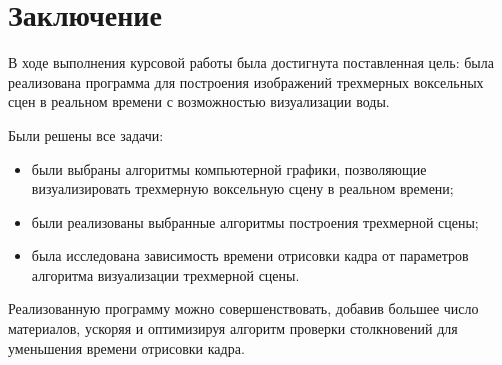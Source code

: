 \chapter*{Заключение}

В ходе выполнения курсовой работы была достигнута поставленная цель:
была реализована программа для построения 
изображений трехмерных воксельных сцен в реальном времени с возможностью визуализации воды.

Были решены все задачи:
\begin{itemize}
    \item были выбраны алгоритмы компьютерной 
          графики, позволяющие визуализировать трехмерную воксельную
          сцену в реальном времени;
    \item были реализованы выбранные алгоритмы построения трехмерной сцены;
    \item была исследована зависимость времени отрисовки кадра от 
          параметров алгоритма визуализации трехмерной сцены.
\end{itemize}

Реализованную программу можно совершенствовать, 
добавив большее число материалов, ускоряя и оптимизируя алгоритм 
проверки столкновений для уменьшения времени отрисовки кадра.
